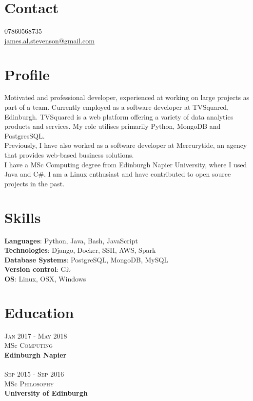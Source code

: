 \documentclass[14pt, a4paper]{extarticle}
\begin{document}
\par{\bigskip\par
\section{Contact}
\large
07860568735\\
\href{mailto:james.al.stevenson@gmail.com}{james.al.stevenson@gmail.com}\\
}

\begin{multicols}{2}

\section{Profile}
\noindent Motivated and professional developer, experienced at working on large projects as part of a team. Currently employed as a software developer at TVSquared, Edinburgh. TVSquared is a web platform offering a variety of data analytics products and services. My role utilises primarily Python, MongoDB and PostgresSQL.\\
Previously, I have also worked as a software developer at Mercurytide, an agency that provides web-based business solutions.\\
I have a MSc Computing degree from Edinburgh Napier University, where I used Java and C\#. I am a Linux enthusiast and have contributed to open source projects in the past.

\section{Skills}
\noindent\textbf{Languages}: Python, Java, Bash, JavaScript\\
\textbf{Technologies}: Django, Docker, SSH, AWS, Spark\\
\textbf{Database Systems}: PostgreSQL, MongoDB, MySQL\\
\textbf{Version control}: Git\\
\textbf{OS}: Linux, OSX, Windows

\section{Education}
\noindent\textsc{Jan} 2017 - \textsc{May} 2018\\
MSc \textsc{Computing} \\
\textbf{Edinburgh Napier}\\~\\
\textsc{Sep} 2015 - \textsc{Sep} 2016\\
MSc \textsc{Philosophy} \\
\textbf{University of Edinburgh}


\end{multicols}
\end{document}
